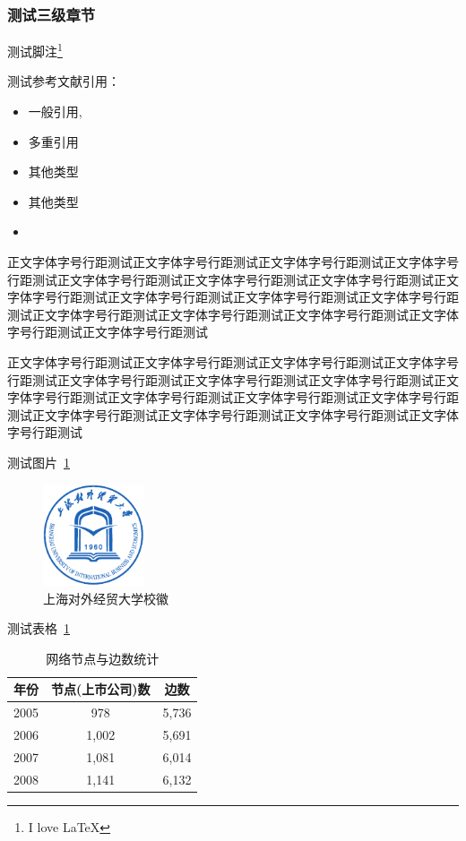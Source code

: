 \documentclass{SUIBEthesis}
\begin{document}
\subsubsection{测试三级章节}

测试脚注\footnote{I love \LaTeX}

测试参考文献引用：

\begin{itemize}
\item 一般引用\cite{lamport1994latex},\cite{马丽莎2014交叉持股关系影响股价联动吗}
\item 多重引用\cite{lamport1994latex, knuth1984texbook}
\item 其他类型\cite[see][]{knuth1984texbook}
\item 其他类型\cite[section2]{knuth1984texbook}
  \item \cite[see][]{knuth1984texbook, lamport1994latex, 马丽莎2014交叉持股关系影响股价联动吗}
\end{itemize}


正文字体字号行距测试正文字体字号行距测试正文字体字号行距测试正文字体字号行距测试正文字体字号行距测试正文字体字号行距测试正文字体字号行距测试正文字体字号行距测试正文字体字号行距测试正文字体字号行距测试正文字体字号行距测试正文字体字号行距测试正文字体字号行距测试正文字体字号行距测试正文字体字号行距测试正文字体字号行距测试

正文字体字号行距测试正文字体字号行距测试正文字体字号行距测试正文字体字号行距测试正文字体字号行距测试正文字体字号行距测试正文字体字号行距测试正文字体字号行距测试正文字体字号行距测试正文字体字号行距测试正文字体字号行距测试正文字体字号行距测试正文字体字号行距测试正文字体字号行距测试正文字体字号行距测试


测试图片~\ref{fig:1} 

\begin{figure}[htbp!]
  \centering
  \includegraphics[height=3cm]{data/figure/logo.pdf}
  \caption{上海对外经贸大学校徽}
  \label{fig:1}
\end{figure}


测试表格~\ref{tab:1}

\begin{table}[htbp]
  \centering
  \caption{网络节点与边数统计}
  \begin{tabular}{ccc}
    \toprule
    \toprule
    年份    & 节点(上市公司)数   & 边数 \\
    \midrule
    2005  & 978   & 5,736 \\
    2006  & 1,002 & 5,691 \\
    2007  & 1,081 & 6,014 \\
    2008  & 1,141 & 6,132 \\
    \bottomrule
    \bottomrule
  \end{tabular}%
  \label{tab:1}%
\end{table}%
\end{document}
